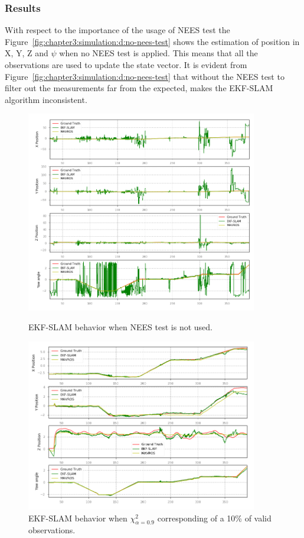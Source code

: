 \subsubsection{Results}
\label{subsubsec:chapter3:simulation:d:results}
With respect to the importance of the usage of \ac{NEES} test the Figure~\ref{fig:chapter3:simulation:d:no-nees-test} shows the estimation of position in X, Y, Z and $\psi$ when no \ac{NEES} test is applied. This means that all the observations are used to update the state vector. It is evident from Figure~\ref{fig:chapter3:simulation:d:no-nees-test} that without the \ac{NEES} test to filter out the measurements far from the expected, makes the EKF-SLAM algorithm inconsistent.\\
\begin{figure}
    \centering
    \includegraphics[width=0.9\textwidth]{Images/fig24-no-nees-test.png}
    \caption[EKF-SLAM behavior when NEES test is not used.]{EKF-SLAM behavior when \ac{NEES} test is not used.}
    \label{fig:chapter3:simulation:d:no-nees-test}
    \centering
    \includegraphics[width=0.9\textwidth]{Images/fig24-nees-10-path.png}
    \caption[EKF-SLAM behavior when $\chi_{\alpha=0.9}^2$]{EKF-SLAM behavior when $\chi_{\alpha=0.9}^2$ corresponding of a 10\% of valid observations.}
    \label{fig:chapter3:simulation:d:nees-10}
\end{figure}

